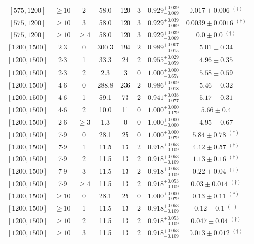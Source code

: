 \begin{table}[!htbp]
{\begin{tabular}{ccc|ccccc}
$[575,1200]$ & $\geq10$ & 2 & 58.0 & 120 & 3 & $0.929^{+0.039}_{-0.069}$ & $0.017 \pm 0.006$ $^{(\dagger)}$ \\ 
$[575,1200]$ & $\geq10$ & 3 & 58.0 & 120 & 3 & $0.929^{+0.039}_{-0.069}$ & $0.0039 \pm 0.0016$ $^{(\dagger)}$ \\ 
$[575,1200]$ & $\geq10$ & $\geq4$ & 58.0 & 120 & 3 & $0.929^{+0.039}_{-0.069}$ & $0.0 \pm 0.0$ $^{(\dagger)}$ \\ 
\hline 
$[1200,1500]$ & 2-3 & 0 & 300.3 & 194 & 2 & $0.989^{+0.007}_{-0.015}$ & $5.01 \pm 0.34$ \\ 
$[1200,1500]$ & 2-3 & 1 & 33.3 & 24 & 2 & $0.955^{+0.029}_{-0.059}$ & $4.96 \pm 0.35$ \\ 
$[1200,1500]$ & 2-3 & 2 & 2.3 & 3 & 0 & $1.000^{+0.000}_{-0.657}$ & $5.58 \pm 0.59$ \\ 
$[1200,1500]$ & 4-6 & 0 & 288.8 & 236 & 2 & $0.986^{+0.009}_{-0.018}$ & $5.46 \pm 0.32$ \\ 
$[1200,1500]$ & 4-6 & 1 & 59.1 & 73 & 2 & $0.941^{+0.038}_{-0.077}$ & $5.17 \pm 0.31$ \\ 
$[1200,1500]$ & 4-6 & 2 & 10.0 & 11 & 0 & $1.000^{+0.000}_{-0.179}$ & $5.66 \pm 0.4$ \\ 
$[1200,1500]$ & 2-6 & $\geq3$ & 1.3 & 0 & 0 & $1.000^{+0.000}_{-0.000}$ & $4.95 \pm 0.67$ \\ 
$[1200,1500]$ & 7-9 & 0 & 28.1 & 25 & 0 & $1.000^{+0.000}_{-0.079}$ & $5.84 \pm 0.78$ $^{(*)}$ \\ 
$[1200,1500]$ & 7-9 & 1 & 11.5 & 13 & 2 & $0.918^{+0.053}_{-0.109}$ & $4.12 \pm 0.57$ $^{(\dagger)}$ \\ 
$[1200,1500]$ & 7-9 & 2 & 11.5 & 13 & 2 & $0.918^{+0.053}_{-0.109}$ & $1.13 \pm 0.16$ $^{(\dagger)}$ \\ 
$[1200,1500]$ & 7-9 & 3 & 11.5 & 13 & 2 & $0.918^{+0.053}_{-0.109}$ & $0.22 \pm 0.04$ $^{(\dagger)}$ \\ 
$[1200,1500]$ & 7-9 & $\geq4$ & 11.5 & 13 & 2 & $0.918^{+0.053}_{-0.109}$ & $0.03 \pm 0.014$ $^{(\dagger)}$ \\ 
$[1200,1500]$ & $\geq10$ & 0 & 28.1 & 25 & 0 & $1.000^{+0.000}_{-0.079}$ & $0.13 \pm 0.11$ $^{(*)}$ \\ 
$[1200,1500]$ & $\geq10$ & 1 & 11.5 & 13 & 2 & $0.918^{+0.053}_{-0.109}$ & $0.12 \pm 0.1$ $^{(\dagger)}$ \\ 
$[1200,1500]$ & $\geq10$ & 2 & 11.5 & 13 & 2 & $0.918^{+0.053}_{-0.109}$ & $0.047 \pm 0.04$ $^{(\dagger)}$ \\ 
$[1200,1500]$ & $\geq10$ & 3 & 11.5 & 13 & 2 & $0.918^{+0.053}_{-0.109}$ & $0.013 \pm 0.012$ $^{(\dagger)}$ \\ 

\end{tabular}}
\end{table}
